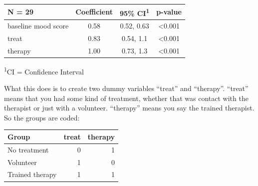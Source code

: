 \documentclass[]{book}
\newenvironment{Shaded}{\begin{snugshade}}{\end{snugshade}}
\newcommand{\DataTypeTok}[1]{\textcolor[rgb]{0.13,0.29,0.53}{#1}}
\newcommand{\DecValTok}[1]{\textcolor[rgb]{0.00,0.00,0.81}{#1}}
\newcommand{\KeywordTok}[1]{\textcolor[rgb]{0.13,0.29,0.53}{\textbf{#1}}}
\newcommand{\NormalTok}[1]{#1}
\newcommand{\OperatorTok}[1]{\textcolor[rgb]{0.81,0.36,0.00}{\textbf{#1}}}
\newcommand{\StringTok}[1]{\textcolor[rgb]{0.31,0.60,0.02}{#1}}
\begin{document}
\begin{Shaded}
\end{Shaded}

\captionsetup[table]{labelformat=empty,skip=1pt}
\begin{longtable}{lccc}
\toprule
\textbf{N = 29} & \textbf{Coefficient} & \textbf{95\% CI}\textsuperscript{1} & \textbf{p-value} \\ 
\midrule
baseline mood score & 0.58 & 0.52, 0.63 & <0.001 \\ 
treat & 0.83 & 0.54, 1.1 & <0.001 \\ 
therapy & 1.00 & 0.73, 1.3 & <0.001 \\ 
\bottomrule
\end{longtable}
\vspace{-5mm}
\begin{minipage}{\linewidth}
\textsuperscript{1}CI = Confidence Interval \\ 
\end{minipage}

What this does is to create two dummy variables ``treat'' and ``therapy''. ``treat'' means that you had some kind of treatment, whether that was contact with the therapist or just with a volunteer. ``therapy'' means you say the trained therapist. So the groups are coded:

\captionsetup[table]{labelformat=empty,skip=1pt}
\begin{longtable}{lrr}
\toprule
Group & treat & therapy \\ 
\midrule
No treatment & 0 & 1 \\ 
Volunteer & 1 & 0 \\ 
Trained therapy & 1 & 1 \\ 
\bottomrule
\end{longtable}
\end{document}
